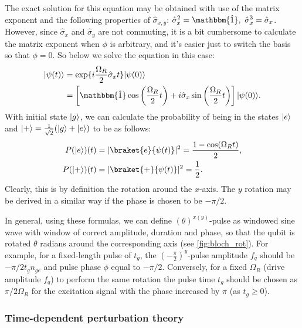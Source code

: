 The exact solution for this equation may be obtained with use of the matrix exponent and the following properties of $\hat \sigma_{x,y}$: $\hat \sigma_x^2 = \mathbbm{\hat 1},\ \hat \sigma_x^3 = \hat\sigma_x$. However, since $\hat \sigma_x$ and $\hat \sigma_y$ are not commuting, it is a bit cumbersome to calculate the matrix exponent when $\phi$ is arbitrary, and it's easier just to switch the basis so that $\phi=0$. So below we solve the equation in this case:
\begin{equation}
\begin{aligned}
\ket{\psi(t)} &= \exp\{i\frac{\Omega_R}{2}\hat \sigma_x t\} \ket{\psi(0)}\\
& = \left[\mathbbm{\hat 1} \cos\left(\frac{\Omega_R}{2}  t\right) + i\hat \sigma_x \sin\left(\frac{\Omega_R}{2} t\right)\right]\ket{\psi(0)}. 
\end{aligned}
\end{equation}
With initial state $\lvert g\rangle$, we can calculate the probability of being in the states $\lvert e\rangle$ and $\lvert+\rangle = \frac{1}{\sqrt{2}}(\lvert g\rangle+\lvert e\rangle)$ to be  as follows:
\begin{equation}
\begin{aligned}
P(\ket{e})(t) &= |\braket{e}{\psi(t)}|^2 = \frac{1-\cos(\Omega_R t)}{2},\\
P(\ket{+})(t) &= |\braket{+}{\psi(t)}|^2 = \frac{1}{2}.
\end{aligned}
\label{eq:x_rotation}
\end{equation}
Clearly, this is by definition the rotation around the $x$-axis. The $y$ rotation may be derived in a similar way if the phase is chosen to be $-\pi/2$. 

In general, using these formulas, we can define $(\theta)^{x(y)}$-pulse as windowed sine wave with window of correct amplitude, duration and phase, so that the qubit is rotated $\theta$ radians around the corresponding axis (see \autoref{fig:bloch_rot}). For example, for a fixed-length pulse of $t_g$, the $(-\frac{\pi}{2})^{y}$-pulse amplitude $f_q$ should be $- \pi/2 t_g n_{ge}$ and pulse phase $\phi$ equal to $-\pi/2$. Conversely, for a fixed $\Omega_R$ (drive amplitude $f_q$) to perform the same rotation the pulse time $t_g$ should be chosen as $\pi/2\Omega_R$ for the excitation signal with the phase increased by $\pi$ (as $t_g\geq 0$).

\subsubsection{Time-dependent perturbation theory}

